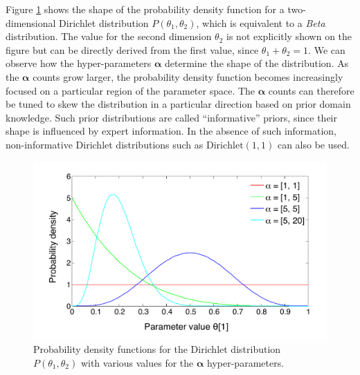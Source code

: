 Figure \ref{fig:dirichletfun} shows the shape of the probability density function for a two-dimensional Dirichlet distribution $P(\theta_1,\theta_2)$, which is equivalent to a \textit{Beta} distribution. The value for the second dimension $\theta_2$ is not explicitly shown on the figure but can be directly derived from the first value, since $\theta_1 + \theta_2=1$.  We can observe how the hyper-parameters $\boldsymbol\alpha$ determine the shape of the distribution. As the $\boldsymbol\alpha$ counts grow larger, the probability density function becomes increasingly focused on a particular region of the parameter space.  The $\boldsymbol\alpha$ counts can therefore be tuned to skew the distribution in a particular direction based on prior domain knowledge. Such prior distributions are called ``informative'' priors, since their shape is influenced by expert information. In the absence of such information, non-informative Dirichlet distributions such as $\mathrm{Dirichlet}(1,1)$ can also be used. 

\begin{figure}[h]
\centering
\includegraphics[scale=0.4]{imgs/dirichletfun.pdf}
\caption{Probability density functions for the Dirichlet distribution $P(\theta_1, \theta_2)$  with various values for the $\boldsymbol\alpha$ hyper-parameters.}
\label{fig:dirichletfun}
\end{figure}

